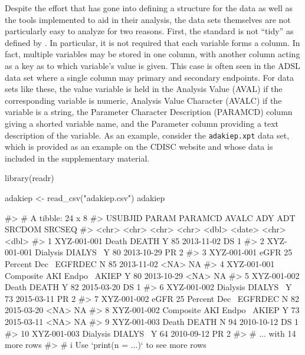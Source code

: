 Despite the effort that has gone into defining a structure for the data
as well as the tools implemented to aid in their analysis, the data sets
themselves are not particularly easy to analyze for two reasons. First,
the standard is not ``tidy'' as defined by \citet{wickham2014}. In
particular, it is not required that each variable forms a column. In
fact, multiple variables may be stored in one column, with another
column acting as a key as to which variable's value is given. This case
is often seen in the ADSL data set where a single column may primary and
secondary endpoints. For data sets like these, the value variable is
held in the Analysis Value (AVAL) if the corresponding variable is
numeric, Analysis Value Character (AVALC) if the variable is a string,
the Parameter Character Description (PARAMCD) column giving a shorted
variable name, and the Parameter column providing a text description of
the variable. As an example, consider the \texttt{adakiep.xpt} data set,
which is provided as an example on the CDISC website and whose data is
included in the supplementary material.

\begin{Schunk}
\begin{Sinput}
library(readr)

adakiep <- read_csv("adakiep.csv") 
adakiep
\end{Sinput}
\begin{Soutput}
#> # A tibble: 24 x 8
#>    USUBJID     PARAM                PARAMCD AVALC   ADY ADT        SRCDOM SRCSEQ
#>    <chr>       <chr>                <chr>   <chr> <dbl> <date>     <chr>   <dbl>
#>  1 XYZ-001-001 Death                DEATH   Y        85 2013-11-02 DS          1
#>  2 XYZ-001-001 Dialysis             DIALYS~ Y        80 2013-10-29 PR          2
#>  3 XYZ-001-001 eGFR 25 Percent Dec~ EGFRDEC N        85 2013-11-02 <NA>       NA
#>  4 XYZ-001-001 Composite AKI Endpo~ AKIEP   Y        80 2013-10-29 <NA>       NA
#>  5 XYZ-001-002 Death                DEATH   Y        82 2015-03-20 DS          1
#>  6 XYZ-001-002 Dialysis             DIALYS~ Y        73 2015-03-11 PR          2
#>  7 XYZ-001-002 eGFR 25 Percent Dec~ EGFRDEC N        82 2015-03-20 <NA>       NA
#>  8 XYZ-001-002 Composite AKI Endpo~ AKIEP   Y        73 2015-03-11 <NA>       NA
#>  9 XYZ-001-003 Death                DEATH   N        94 2010-10-12 DS          1
#> 10 XYZ-001-003 Dialysis             DIALYS~ Y        64 2010-09-12 PR          2
#> # ... with 14 more rows
#> # i Use `print(n = ...)` to see more rows
\end{Soutput}
\end{Schunk}

